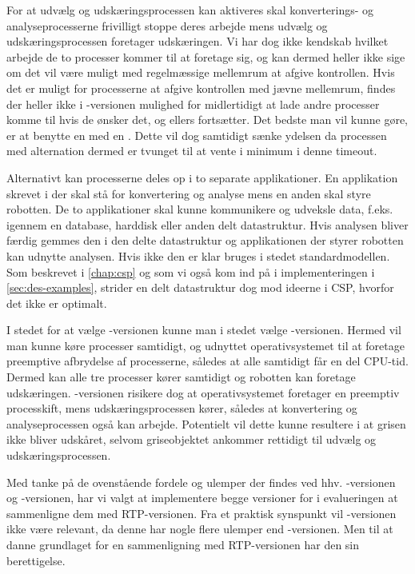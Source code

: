 For at  udvælg og udskæringsprocessen kan aktiveres skal konverterings- og analyseprocesserne frivilligt stoppe deres arbejde mens  udvælg og udskæringsprocessen foretager udskæringen.  Vi har dog ikke kendskab hvilket arbejde de to processer kommer til at foretage sig, og kan dermed heller ikke sige om det vil være muligt med regelmæssige mellemrum at afgive kontrollen. Hvis det er muligt for processerne at afgive kontrollen med jævne mellemrum, findes der heller ikke i -versionen mulighed for midlertidigt at lade andre processer  komme til hvis de ønsker det, og ellers fortsætter. Det bedste man vil kunne gøre, er at benytte en   med en . Dette vil dog samtidigt sænke ydelsen da  processen med alternation dermed er tvunget til at vente i minimum i denne timeout. 

Alternativt kan processerne deles op i to separate applikationer. En applikation skrevet i \pycsp der skal stå for konvertering og analyse mens en anden skal styre robotten. De to applikationer skal kunne kommunikere og  udveksle data, f.eks. igennem en database, harddisk eller anden delt datastruktur. Hvis analysen bliver færdig gemmes den i den delte datastruktur og applikationen der styrer robotten kan udnytte analysen. Hvis ikke den er klar bruges i stedet standardmodellen. Som beskrevet i \autoref{chap:csp} og som vi også kom ind på i implementeringen i \autoref{sec:des-examples}, strider en delt datastruktur dog mod ideerne i CSP, hvorfor det ikke er optimalt.


I stedet for at vælge -versionen kunne man i stedet vælge -versionen. Hermed vil man kunne køre processer samtidigt, og udnyttet operativsystemet til at foretage preemptive afbrydelse af  processerne, således at alle samtidigt får en del CPU-tid. Dermed kan alle tre processer kører samtidigt og robotten kan foretage udskæringen. -versionen risikere dog at operativsystemet foretager en preemptiv processkift, mens udskæringsprocessen kører, således at konvertering og  analyseprocessen også kan arbejde. Potentielt vil dette kunne resultere i at grisen ikke bliver udskåret, selvom griseobjektet ankommer rettidigt til udvælg og udskæringsprocessen.


Med tanke på de ovenstående fordele og ulemper der findes ved hhv.  -versionen og -versionen,  har vi valgt at implementere begge versioner for i evalueringen at sammenligne dem med RTP-versionen. Fra et praktisk synspunkt vil -versionen ikke være relevant, da denne har nogle flere ulemper end -versionen. Men til at danne grundlaget for en sammenligning med RTP-versionen har den sin berettigelse.

